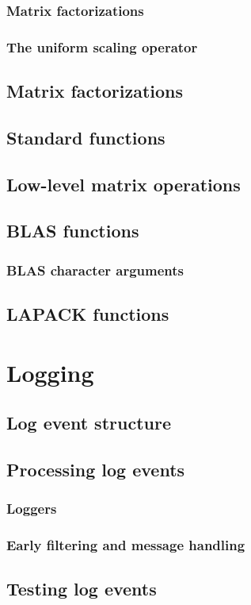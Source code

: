    \subsection{Matrix factorizations}
    \subsection{The uniform scaling operator}
    \section{Matrix factorizations}
    \section{Standard functions}
    \section{Low-level matrix operations}
    \section{BLAS functions}
    \subsection{BLAS character arguments}
    \section{LAPACK functions}
  \chapter{Logging}
    \section{Log event structure}
    \section{Processing log events}
    \subsection{Loggers}
    \subsection{Early filtering and message handling}
    \section{Testing log events}
